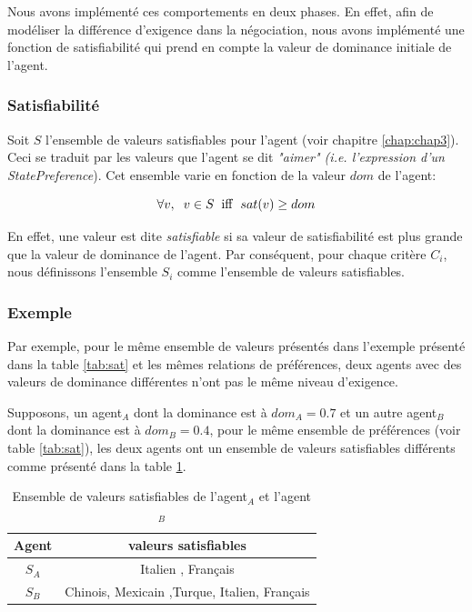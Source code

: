 	Nous avons implémenté ces comportements en deux phases. En effet, afin de modéliser la différence d'exigence dans la négociation, nous avons implémenté une fonction de satisfiabilité qui prend en compte la valeur de dominance initiale de l'agent. 
	
	\subsubsection{Satisfiabilité}
	
	Soit $S$ l'ensemble de valeurs satisfiables pour l'agent (voir chapitre \ref{chap:chap3}). Ceci se traduit par les valeurs que l'agent se dit \textit{"aimer" (i.e. l'expression d'un } \emph{StatePreference}). Cet ensemble varie en fonction de la valeur $dom$ de l'agent:
	
	\begin{equation}
	\forall v,\hspace{2mm} v\in S\hspace{2mm}\mathrm{iff}\hspace{2mm}sat(v) \geq dom
	\end{equation}
	
	En effet, une valeur est dite \textit{satisfiable} si sa valeur de satisfiabilité est plus grande que la valeur de dominance de l'agent.
	Par conséquent, pour chaque critère $C_i$, nous définissons l'ensemble $S_i$ comme l'ensemble de valeurs satisfiables. 
	
	\subsubsection{Exemple}	
	Par exemple, pour le même ensemble de valeurs présentés dans l'exemple présenté dans la table \ref{tab:sat} et les mêmes relations de préférences, deux agents avec des valeurs de dominance différentes n'ont pas le même niveau d'exigence. 
	
	Supposons, un agent$_A$ dont la dominance est à $dom_A=0.7$ et un autre agent$_B$ dont la dominance est à $dom_B=0.4$, pour le même ensemble de préférences (voir table \ref{tab:sat}), les deux agents ont un ensemble de valeurs satisfiables différents comme présenté dans la table \ref{tab:exSat}.
	
	\begin{table}[h]
		\centering
		{\scriptsize
			\begin{tabular}{ |c|c| }
				\hline
				\textbf{Agent} & \textbf{valeurs satisfiables} \\
				\hline				
				$S_A$ & Italien , Français \\
				\hline
				
				$S_B$ & Chinois,  Mexicain ,Turque, Italien, Français\\
				\hline
				
			\end{tabular}}
			\caption{Ensemble de valeurs satisfiables de l'agent$_A$ et l'agent $_B$}
			\label{tab:exSat}
		\end{table}

